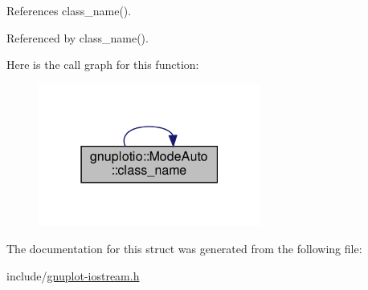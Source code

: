 References class\+\_\+name().



Referenced by class\+\_\+name().

Here is the call graph for this function\+:\nopagebreak
\begin{figure}[H]
\begin{center}
\leavevmode
\includegraphics[width=207pt]{structgnuplotio_1_1_mode_auto_ac73f89a782ac32dd8bc7b8f7a7581523_cgraph}
\end{center}
\end{figure}


The documentation for this struct was generated from the following file\+:\begin{DoxyCompactItemize}
\item 
include/\hyperlink{gnuplot-iostream_8h}{gnuplot-\/iostream.\+h}\end{DoxyCompactItemize}
